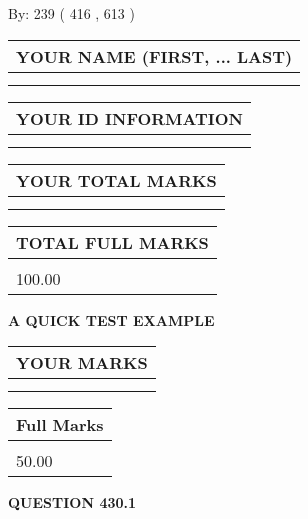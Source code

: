 \documentclass[12pt]{article}
\begin{document}
   
\hspace{1.0in} By: 
 239 ( 416 ,  613 )
   
   
   
   
\newpage 
\setcounter{page}{ 
   430001 } 
   
   
   
   
\noindent\begin{tabular}{|l|}
\hline
YOUR NAME (FIRST, ... LAST)  \\
\hline
 \\ 
 \\ 
\hline
\end{tabular}
\hspace{0.05in} \begin{tabular}{|l|}
\hline
 YOUR   ID   INFORMATION  \\
\hline
 \\ 
 \\ 
\hline
\end{tabular}
   
   
\vspace{0.2in}\noindent\begin{tabular}{|l|}
\hline
YOUR TOTAL MARKS  \\
\hline
 \\ 
 \\ 
\hline
\end{tabular}
\hspace{0.05in} \begin{tabular}{|l|}
\hline
TOTAL FULL MARKS  \\
\hline
 \\ 
100.00 \\
\hline
\end{tabular}
   
   
 \vspace{0.2in}
{\LARGE {\textbf{ A QUICK TEST EXAMPLE}}}
   
   
  
\vspace{0.2in}
  
\noindent\begin{tabular}{|l|}
\hline
 YOUR MARKS  \\
\hline
 \\ 
 \\ 
\hline
\end{tabular}
\hspace{0.05in} \begin{tabular}{|l|}
\hline
 Full Marks  \\
\hline
 \\ 
50.00 \\
\hline
\end{tabular}
{\textbf{\Large{QUESTION
430.1 
}}}
  
\end{document}
